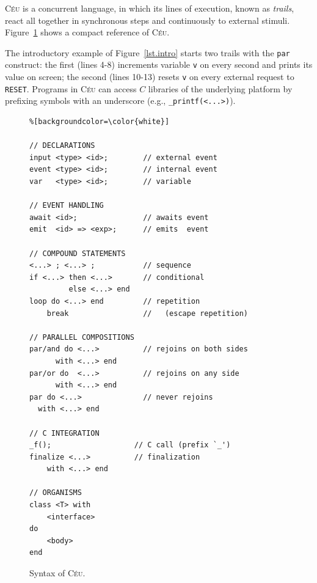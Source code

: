 \documentclass{acm_proc_article-sp}
\newcommand{\CEU}{\textsc{C\'{e}u}\xspace}
\newcommand{\code}[1] {{\small{\texttt{#1}}}}
\newcommand{\1}{\;}
\newcommand{\2}{\;\;}
\newcommand{\3}{\;\;\;}
\newcommand{\5}{\;\;\;\;\;}
\begin{document}
\CEU is a concurrent language, in which its lines of execution, known as 
\emph{trails}, react all together in synchronous steps and continuously to 
external stimuli.
%
Figure~\ref{lst.syntax} shows a compact reference of \CEU.

The introductory example of Figure~\ref{lst.intro} starts two trails with the 
\code{par} construct: the first (lines 4-8) increments variable \code{v} on 
every second and prints its value on screen; the second (lines 10-13) resets 
\code{v} on every external request to \code{RESET}.
%
%
Programs in \CEU can access $C$ libraries of the underlying platform by 
prefixing symbols with an underscore (e.g., \code{\_printf(<...>)}).

\begin{figure}[t]
\begin{lstlisting}%[backgroundcolor=\color{white}]

// DECLARATIONS
input <type> <id>;        // external event
event <type> <id>;        // internal event
var   <type> <id>;        // variable

// EVENT HANDLING
await <id>;               // awaits event
emit  <id> => <exp>;      // emits  event

// COMPOUND STATEMENTS
<...> ; <...> ;           // sequence
if <...> then <...>       // conditional
         else <...> end
loop do <...> end         // repetition
    break                 //   (escape repetition)

// PARALLEL COMPOSITIONS
par/and do <...>          // rejoins on both sides
      with <...> end
par/or do  <...>          // rejoins on any side
      with <...> end
par do <...>              // never rejoins
  with <...> end

// C INTEGRATION
_f();                   // C call (prefix `_')
finalize <...>          // finalization
    with <...> end

// ORGANISMS
class <T> with
    <interface>
do
    <body>
end
\end{lstlisting}
\caption{ Syntax of \CEU.
\label{lst.syntax}
}
\end{figure}

\end{document}
